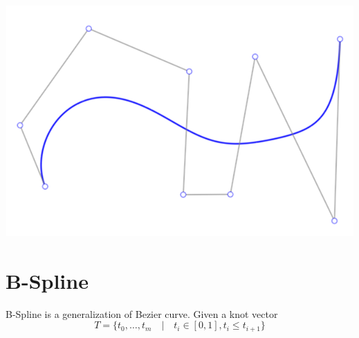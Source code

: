\documentclass[UTF8]{ctexart}
\begin{document}
\begin{center}
	\includegraphics{bezier_02.png}
\end{center}

\section{B-Spline}
B-Spline is a generalization of Bezier curve. Given a knot vector $$T=\{t_0, \ldots, t_m  \quad|\quad t_i \in \left[0, 1\right], t_i \leq t_{i+1}\}$$
\end{document}

